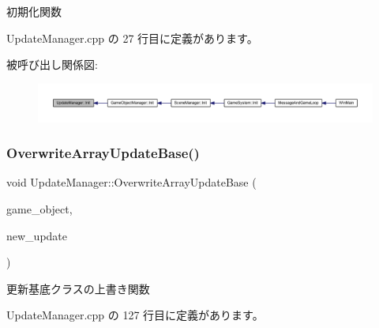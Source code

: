初期化関数 



 Update\+Manager.\+cpp の 27 行目に定義があります。

被呼び出し関係図\+:
\nopagebreak
\begin{figure}[H]
\begin{center}
\leavevmode
\includegraphics[width=350pt]{class_update_manager_a7b0a2a3bf51d4fcb83fd25fe642fc66b_icgraph}
\end{center}
\end{figure}
\mbox{\label{class_update_manager_ab4f492c33ed941ddd01ccae8218080ff}} 
\subsubsection{\texorpdfstring{Overwrite\+Array\+Update\+Base()}{OverwriteArrayUpdateBase()}}
{\footnotesize\ttfamily void Update\+Manager\+::\+Overwrite\+Array\+Update\+Base (\begin{DoxyParamCaption}\item[{\mbox{\hyperlink{class_game_object_base}{Game\+Object\+Base}} $\ast$}]{game\+\_\+object,  }\item[{\mbox{\hyperlink{class_update_base}{Update\+Base}} $\ast$}]{new\+\_\+update }\end{DoxyParamCaption})}



更新基底クラスの上書き関数 



 Update\+Manager.\+cpp の 127 行目に定義があります。


